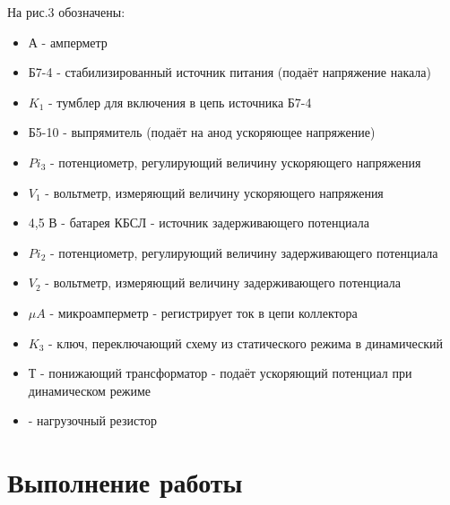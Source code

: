 \documentclass[a4paper]{article}
\begin{document}
На рис.3 обозначены:
\begin{itemize}
    \item А - амперметр
    \item Б7-4 - стабилизированный источник питания (подаёт напряжение накала)
    \item $K_1$ - тумблер для включения в цепь источника Б7-4
    \item Б5-10 - выпрямитель (подаёт на анод ускоряющее напряжение)
    \item $Pi_3$ - потенциометр, регулирующий величину ускоряющего напряжения
    \item $V_1$ - вольтметр, измеряющий величину ускоряющего напряжения
    \item 4,5 В - батарея КБСЛ - источник задерживающего потенциала
    \item $Pi_2$ - потенциометр, регулирующий величину задерживающего потенциала
    \item $V_2$ - вольтметр, измеряющий величину задерживающего потенциала
    \item $\mu A$ - микроамперметр - регистрирует ток в цепи коллектора
    \item $K_3$ - ключ, переключающий схему из статического режима в динамический
    \item Т - понижающий трансформатор - подаёт ускоряющий потенциал при динамическом режиме
    \item - нагрузочный резистор
\end{itemize}

\section{Выполнение работы}
\end{document}
